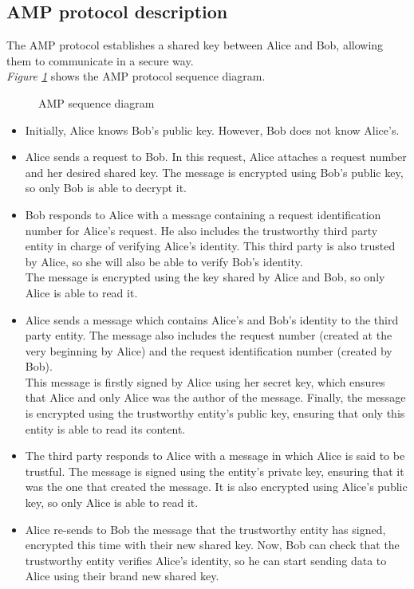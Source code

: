 \subsection{AMP protocol description}\label{subsec:amp1}

The AMP protocol establishes a shared key between Alice and Bob, allowing them to communicate in a secure way.\\
\textit{Figure \ref{fig:amptrace}} shows the AMP protocol sequence diagram.
\\
\begin{figure}[hb!]
	\centering	
	
	\caption{AMP sequence diagram}
	\label{fig:amptrace}
\end{figure}
\begin{itemize}
	\item Initially, Alice knows Bob's public key. However, Bob does not know Alice's.
	\item Alice sends a request to Bob. In this request, Alice attaches a request number and her desired shared key. The message is encrypted using Bob's public key, so only Bob is able to decrypt it.
	\item Bob responds to Alice with a message containing a request identification number for Alice's request. He also includes the trustworthy third party entity in charge of verifying Alice's identity. This third party is also trusted by Alice, so she will also be able to verify Bob's identity.\\
		The message is encrypted using the key shared by Alice and Bob, so only Alice is able to read it.
	\item Alice sends a message which contains Alice's and Bob's identity to the third party entity. The message also includes the request number (created at the very beginning by Alice) and the request identification number (created by Bob).\\
		This message is firstly signed by Alice using her secret key, which ensures that Alice and only Alice was the author of the message. Finally, the message is encrypted using the trustworthy entity's public key, ensuring that only this entity is able to read its content.
	\item The third party responds to Alice with a message in which Alice is said to be trustful. The message is signed using the entity's private key, ensuring that it was the one that created the message. It is also encrypted using Alice's public key, so only Alice is able to read it.
	\item Alice re-sends to Bob the message that the trustworthy entity has signed, encrypted this time with their new shared key. Now, Bob can check that the trustworthy entity verifies Alice's identity, so he can start sending data to Alice using their brand new shared key.
\end{itemize}

